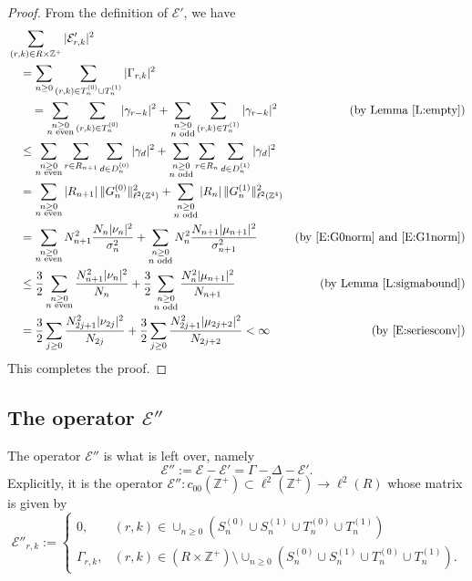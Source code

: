 \documentclass[11pt,reqno]{amsart}
\theoremstyle{plain}
\theoremstyle{definition}
\theoremstyle{remark}
\newcommand{\cE}{\mathcal{E}}
\newcommand{\ZZ}{\mathbb{Z}}
\begin{document}
\begin{proof}
From the definition of $\cE'$, we have
\begin{align*}
&\sum_{(r,k)\in R\times\ZZ^+}|\cE'_{r,k}|^2\\
&\quad=\sum_{n\ge0}\sum_{(r,k)\in T_n^{(0)}\cup T_n^{(1)}}|\Gamma_{r,k}|^2\\
&\qquad=\sum_{\substack{n\ge0\\n\text{~even}}}\sum_{(r,k)\in T_n^{(0)}}|\gamma_{r-k}|^2
+\sum_{\substack{n\ge0\\n\text{~odd}}}\sum_{(r,k)\in T_n^{(1)}}|\gamma_{r-k}|^2
&\text{(by Lemma~\ref{L:empty})}\\
&\quad\le\sum_{\substack{n\ge0\\n\text{~even}}}\sum_{r\in R_{n+1}}\sum_{d\in D_n^{(0)}}|\gamma_{d}|^2
+\sum_{\substack{n\ge0\\n\text{~odd}}}\sum_{r\in R_{n}}\sum_{d\in D_n^{(1)}}|\gamma_{d}|^2\\
&\quad=\sum_{\substack{n\ge0\\n\text{~even}}}|R_{n+1}|\,\|G_n^{(0)}\|_{\ell^2(\ZZ^4)}^2
+\sum_{\substack{n\ge0\\n\text{~odd}}}|R_{n}|\,\|G_n^{(1)}\|_{\ell^2(\ZZ^4)}^2\\
&\quad=\sum_{\substack{n\ge0\\n\text{~even}}}N_{n+1}^2\frac{N_n|\nu_n|^2}{\sigma_n^2}
+\sum_{\substack{n\ge0\\n\text{~odd}}}N_{n}^2\frac{N_{n+1}|\mu_{n+1}|^2}{\sigma_{n+1}^2}
&\text{(by \eqref{E:G0norm} and \eqref{E:G1norm})}\\
&\quad\le\frac{3}{2}\sum_{\substack{n\ge0\\n\text{~even}}}\frac{N_{n+1}^2|\nu_n|^2}{N_n}
+\frac{3}{2}\sum_{\substack{n\ge0\\n\text{~odd}}}\frac{N_{n}^2|\mu_{n+1}|^2}{N_{n+1}}
&\text{(by Lemma~\ref{L:sigmabound})}\\
&\quad=\frac{3}{2}\sum_{j\ge0}\frac{N_{2j+1}^2|\nu_{2j}|^2}{N_{2j}}
+\frac{3}{2}\sum_{j\ge0}\frac{N_{2j+1}^2|\mu_{2j+2}|^2}{N_{2j+2}}
<\infty
&\text{(by \eqref{E:seriesconv})}\\
\end{align*}
This completes the proof.
\end{proof}

\subsection{The operator $\cE''$}
The operator $\cE''$ is what is left over, namely
\[
\cE'':=\cE-\cE'=\Gamma-\Delta-\cE'.
\]
Explicitly, it is the operator 
$\cE'':c_{00}(\ZZ^+)\subset\ell^2(\ZZ^+)\to\ell^2(R)$ whose matrix is given by
\begin{equation}\label{E:cE''}
\cE''_{r,k}:=
\begin{cases}
0, &(r,k)\in \cup_{n\ge0}(S_n^{(0)}\cup S_n^{(1)}\cup T_n^{(0)}\cup T_n^{(1)})\\
\Gamma_{r,k}, &(r,k)\in (R\times\ZZ^+)\setminus \cup_{n\ge0}(S_n^{(0)}\cup S_n^{(1)}\cup T_n^{(0)}\cup T_n^{(1)}).
\end{cases}
\end{equation}
\end{document}
